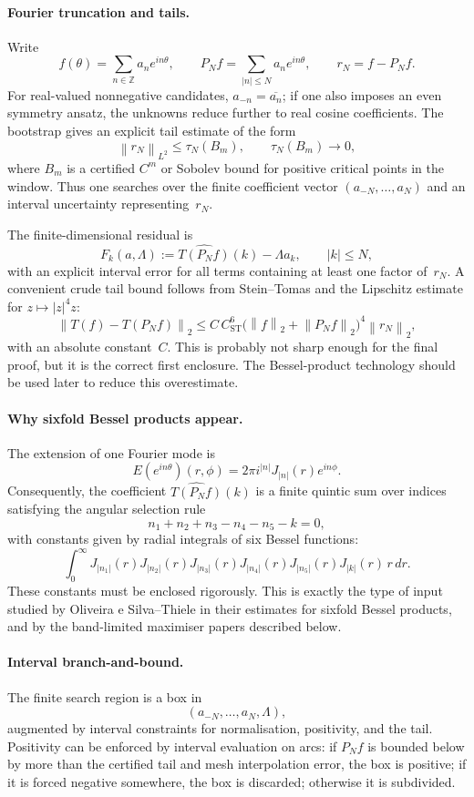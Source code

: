 \documentclass[12pt]{article}
\theoremstyle{definition}
\theoremstyle{remark}
\newcommand{\Z}{\mathbb{Z}}
\newcommand{\norm}[1]{\left\|#1\right\|}
\begin{document}
\paragraph{Fourier truncation and tails.}
Write
\[
  f(\theta)=\sum_{n\in\Z}a_ne^{in\theta},\qquad
  P_Nf=\sum_{|n|\leq N}a_ne^{in\theta},\qquad r_N=f-P_Nf.
\]
For real-valued nonnegative candidates, $a_{-n}=\overline{a_n}$; if one
also imposes an even symmetry ansatz, the unknowns reduce further to real
cosine coefficients.  The bootstrap gives an explicit tail estimate of
the form
\[
  \norm{r_N}_{L^2}\leq \tau_N(B_m),
  \qquad
  \tau_N(B_m)\to0,
\]
where $B_m$ is a certified $C^m$ or Sobolev bound for positive critical
points in the window.  Thus one searches over the finite coefficient vector
$(a_{-N},\ldots,a_N)$ and an interval uncertainty representing~$r_N$.

The finite-dimensional residual is
\[
  F_k(a,\Lambda)
  :=
  \widehat{T(P_Nf)}(k)-\Lambda a_k,
  \qquad |k|\leq N,
\]
with an explicit interval error for all terms containing at least one
factor of~$r_N$.  A convenient crude tail bound follows from
Stein--Tomas and the Lipschitz estimate for $z\mapsto |z|^4z$:
\[
  \norm{T(f)-T(P_Nf)}_2
  \leq
  C\,C_{\mathrm{ST}}^6
  \bigl(\norm{f}_2+\norm{P_Nf}_2\bigr)^4
  \norm{r_N}_2,
\]
with an absolute constant~$C$.  This is probably not sharp enough for the
final proof, but it is the correct first enclosure.  The Bessel-product
technology should be used later to reduce this overestimate.

\paragraph{Why sixfold Bessel products appear.}
The extension of one Fourier mode is
\[
  E(e^{in\theta})(r,\phi)
  =2\pi i^{|n|}J_{|n|}(r)e^{in\phi}.
\]
Consequently, the coefficient $\widehat{T(P_Nf)}(k)$ is a finite quintic
sum over indices satisfying the angular selection rule
\[
  n_1+n_2+n_3-n_4-n_5-k=0,
\]
with constants given by radial integrals of six Bessel functions:
\[
  \int_0^\infty
  J_{|n_1|}(r)J_{|n_2|}(r)J_{|n_3|}(r)
  J_{|n_4|}(r)J_{|n_5|}(r)J_{|k|}(r)\,r\,dr.
\]
These constants must be enclosed rigorously.  This is exactly the type of
input studied by Oliveira e Silva--Thiele in their estimates for sixfold
Bessel products, and by the band-limited maximiser papers described below.

\paragraph{Interval branch-and-bound.}
The finite search region is a box in
\[
  (a_{-N},\ldots,a_N,\Lambda),
\]
augmented by interval constraints for normalisation, positivity, and the
tail.  Positivity can be enforced by interval evaluation on arcs: if
$P_Nf$ is bounded below by more than the certified tail and mesh
interpolation error, the box is positive; if it is forced negative
somewhere, the box is discarded; otherwise it is subdivided.
\end{document}
